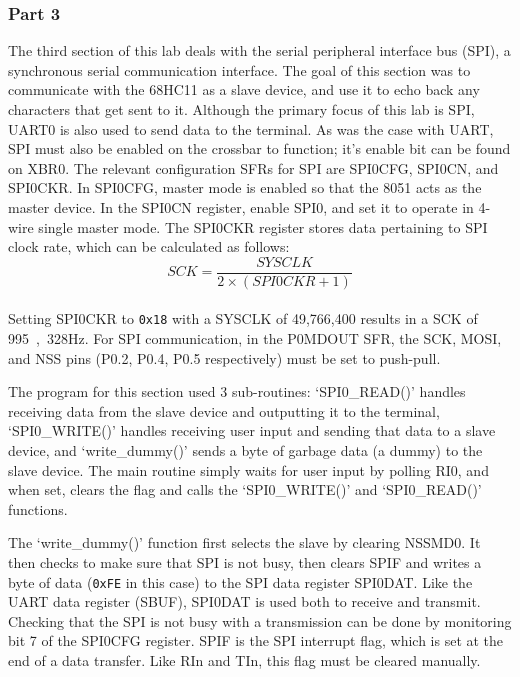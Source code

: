 \documentclass[12pt]{article}
\begin{document}
\subsubsection{Part 3}
The third section of this lab deals with the serial peripheral interface bus (SPI), a synchronous serial communication interface. The goal of this section was to communicate with the 68HC11 as a slave device, and use it to echo back any characters that get sent to it. Although the primary focus of this lab is SPI, UART0 is also used to send data to the terminal. As was the case with UART, SPI must also be enabled on the crossbar to function; it's enable bit can be found on XBR0. The relevant configuration SFRs for SPI are SPI0CFG, SPI0CN, and SPI0CKR. In SPI0CFG, master mode is enabled so that the 8051 acts as the master device. In the SPI0CN register, enable SPI0, and set it to operate in 4-wire single master mode. The SPI0CKR register stores data pertaining to SPI clock rate, which can be calculated as follows:\\
\begin{equation}
SCK = \frac{SYSCLK}{2\times(SPI0CKR+1)}
\end{equation}\\
Setting SPI0CKR to \texttt{0x18} with a SYSCLK of 49,766,400 results in a SCK of \si{995,328}{Hz}. For SPI communication, in the P0MDOUT SFR, the SCK, MOSI, and NSS pins (P0.2, P0.4, P0.5 respectively) must be set to push-pull.

The program for this section used 3 sub-routines: `SPI0\_READ()' handles receiving data from the slave device and outputting it to the terminal, `SPI0\_WRITE()' handles receiving user input and sending that data to a slave device, and `write\_dummy()' sends a byte of garbage data (a dummy) to the slave device. The main routine simply waits for user input by polling RI0, and when set, clears the flag and calls the  `SPI0\_WRITE()' and `SPI0\_READ()' functions.

The `write\_dummy()' function first selects the slave by clearing NSSMD0. It then checks to make sure that SPI is not busy, then clears SPIF and writes a byte of data (\texttt{0xFE} in this case) to the SPI data register SPI0DAT. Like the UART data register (SBUF), SPI0DAT is used both to receive and transmit. Checking that the SPI is not busy with a transmission can be done by monitoring bit 7 of the SPI0CFG register. SPIF is the SPI interrupt flag, which is set at the end of a data transfer. Like RIn and TIn, this flag must be cleared manually. 
\end{document}
